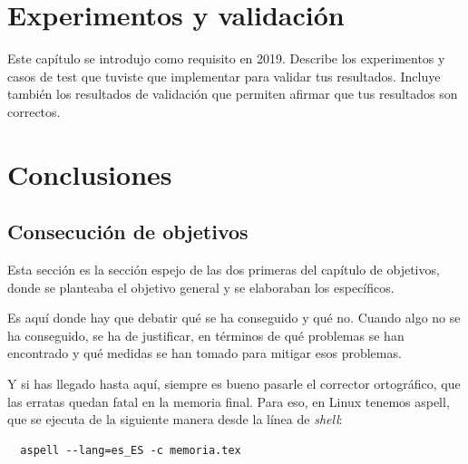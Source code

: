 \documentclass[a4paper, 12pt]{book}
\begin{document}

\cleardoublepage

\chapter{Experimentos y validación}

Este capítulo se introdujo como requisito en 2019. 
Describe los experimentos y casos de test que tuviste que implementar para validar tus resultados. 
Incluye también los resultados de validación que permiten afirmar que tus resultados son correctos. 




\cleardoublepage
\chapter{Conclusiones}
\label{chap:conclusiones}


\section{Consecución de objetivos}
\label{sec:consecucion-objetivos}

Esta sección es la sección espejo de las dos primeras del capítulo de objetivos, donde se planteaba el objetivo general y se elaboraban los específicos.

Es aquí donde hay que debatir qué se ha conseguido y qué no. 
Cuando algo no se ha conseguido, se ha de justificar, en términos de qué problemas se han encontrado y qué medidas se han tomado para mitigar esos problemas.

Y si has llegado hasta aquí, siempre es bueno pasarle el corrector ortográfico, que las erratas quedan fatal en la memoria final.
Para eso, en Linux tenemos aspell, que se ejecuta de la siguiente manera desde la línea de \emph{shell}:

\begin{verbatim}
  aspell --lang=es_ES -c memoria.tex
\end{verbatim}
\end{document}
